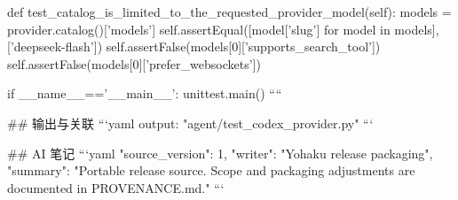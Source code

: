     def test_catalog_is_limited_to_the_requested_provider_model(self):
        models = provider.catalog()['models']
        self.assertEqual([model['slug'] for model in models],['deepseek-flash'])
        self.assertFalse(models[0]['supports_search_tool'])
        self.assertFalse(models[0]['prefer_websockets'])


if __name__=='__main__':
    unittest.main()
````

## 输出与关联
```yaml
output: "agent/test_codex_provider.py"
```

## AI 笔记
```yaml
{"source_version": 1, "writer": "Yohaku release packaging", "summary": "Portable release source. Scope and packaging adjustments are documented in PROVENANCE.md."}
```
